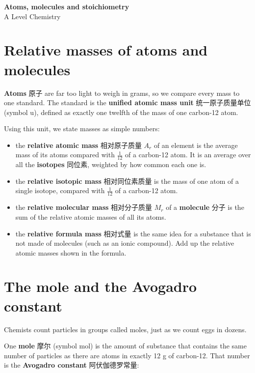 \documentclass[11pt]{article}
\begin{document}
\begin{center}
  {\LARGE\bfseries Atoms, molecules and stoichiometry}\\[0.35em]
  {\large A Level Chemistry}
\end{center}
\vspace{0.6em}

\section*{Relative masses of atoms and molecules}

\textbf{Atoms} 原子 are far too light to weigh in grams, so we compare every mass to one standard. The standard is the \textbf{unified atomic mass unit} 统一原子质量单位 (symbol u), defined as exactly one twelfth of the mass of one carbon-12 atom.

Using this unit, we state masses as simple numbers:

\begin{itemize}
\item the \textbf{relative atomic mass} 相对原子质量 $A_r$ of an element is the average mass of its atoms compared with $\tfrac{1}{12}$ of a carbon-12 atom. It is an average over all the \textbf{isotopes} 同位素, weighted by how common each one is.

\item the \textbf{relative isotopic mass} 相对同位素质量 is the mass of one atom of a single isotope, compared with $\tfrac{1}{12}$ of a carbon-12 atom.

\item the \textbf{relative molecular mass} 相对分子质量 $M_r$ of a \textbf{molecule} 分子 is the sum of the relative atomic masses of all its atoms.

\item the \textbf{relative formula mass} 相对式量 is the same idea for a substance that is not made of molecules (such as an ionic compound). Add up the relative atomic masses shown in the formula.

\end{itemize}

\section*{The mole and the Avogadro constant}

Chemists count particles in groups called moles, just as we count eggs in dozens.

One \textbf{mole} 摩尔 (symbol mol) is the amount of substance that contains the same number of particles as there are atoms in exactly 12 g of carbon-12. That number is the \textbf{Avogadro constant} 阿伏伽德罗常量:
\end{document}
